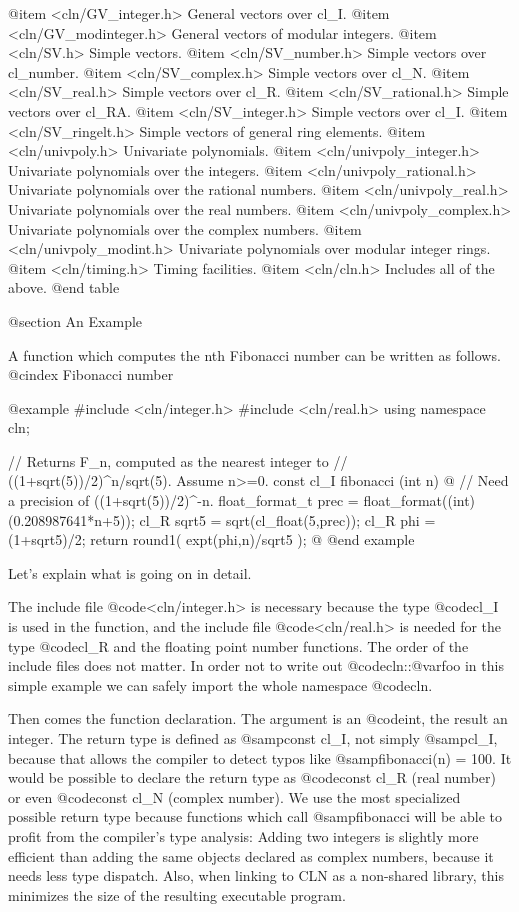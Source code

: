 @item <cln/GV_integer.h>
General vectors over cl_I.
@item <cln/GV_modinteger.h>
General vectors of modular integers.
@item <cln/SV.h>
Simple vectors.
@item <cln/SV_number.h>
Simple vectors over cl_number.
@item <cln/SV_complex.h>
Simple vectors over cl_N.
@item <cln/SV_real.h>
Simple vectors over cl_R.
@item <cln/SV_rational.h>
Simple vectors over cl_RA.
@item <cln/SV_integer.h>
Simple vectors over cl_I.
@item <cln/SV_ringelt.h>
Simple vectors of general ring elements.
@item <cln/univpoly.h>
Univariate polynomials.
@item <cln/univpoly_integer.h>
Univariate polynomials over the integers.
@item <cln/univpoly_rational.h>
Univariate polynomials over the rational numbers.
@item <cln/univpoly_real.h>
Univariate polynomials over the real numbers.
@item <cln/univpoly_complex.h>
Univariate polynomials over the complex numbers.
@item <cln/univpoly_modint.h>
Univariate polynomials over modular integer rings.
@item <cln/timing.h>
Timing facilities.
@item <cln/cln.h>
Includes all of the above.
@end table


@section An Example

A function which computes the nth Fibonacci number can be written as follows.
@cindex Fibonacci number

@example
#include <cln/integer.h>
#include <cln/real.h>
using namespace cln;

// Returns F_n, computed as the nearest integer to
// ((1+sqrt(5))/2)^n/sqrt(5). Assume n>=0.
const cl_I fibonacci (int n)
@{
        // Need a precision of ((1+sqrt(5))/2)^-n.
        float_format_t prec = float_format((int)(0.208987641*n+5));
        cl_R sqrt5 = sqrt(cl_float(5,prec));
        cl_R phi = (1+sqrt5)/2;
        return round1( expt(phi,n)/sqrt5 );
@}
@end example

Let's explain what is going on in detail.

The include file @code{<cln/integer.h>} is necessary because the type
@code{cl_I} is used in the function, and the include file @code{<cln/real.h>}
is needed for the type @code{cl_R} and the floating point number functions.
The order of the include files does not matter.  In order not to write
out @code{cln::}@var{foo} in this simple example we can safely import
the whole namespace @code{cln}.

Then comes the function declaration. The argument is an @code{int}, the
result an integer. The return type is defined as @samp{const cl_I}, not
simply @samp{cl_I}, because that allows the compiler to detect typos like
@samp{fibonacci(n) = 100}. It would be possible to declare the return
type as @code{const cl_R} (real number) or even @code{const cl_N} (complex
number). We use the most specialized possible return type because functions
which call @samp{fibonacci} will be able to profit from the compiler's type
analysis: Adding two integers is slightly more efficient than adding the
same objects declared as complex numbers, because it needs less type
dispatch. Also, when linking to CLN as a non-shared library, this minimizes
the size of the resulting executable program.

